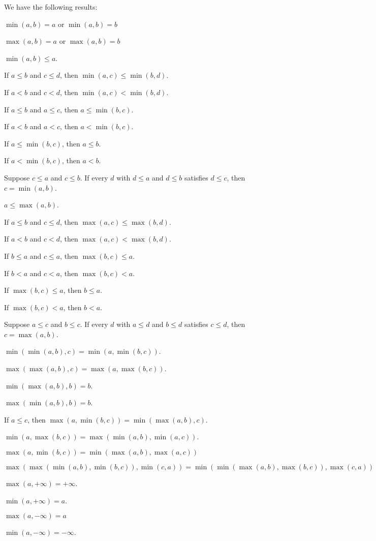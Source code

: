 \documentclass{article}
\begin{document}
We have the following results:
\begin{thm}
\item\label{xxreal0:15} $\min(a,b)=a$ or $\min(a,b)=b$
\item\label{xxreal0:16} $\max(a,b)=a$ or $\max(a,b)=b$
\item\label{xxreal0:17} $\min(a,b)\leq a$.
\item\label{xxreal0:18} If $a\leq b$ and $c\leq d$, then $\min(a,c)\leq\min(b,d)$.
\item\label{xxreal0:19} If $a<b$ and $c<d$, then $\min(a,c)<\min(b,d)$.
\item\label{xxreal0:20} If $a\leq b$ and $a\leq c$, then $a\leq\min(b,c)$.
\item\label{xxreal0:21} If $a<b$ and $a<c$, then $a<\min(b,c)$.
\item\label{xxreal0:22} If $a\leq\min(b,c)$, then $a\leq b$.
\item\label{xxreal0:23} If $a<\min(b,c)$, then $a<b$.
\item\label{xxreal0:24} Suppose $c\leq a$ and $c\leq b$.
  If every $d$ with $d\leq a$ and $d\leq b$ satisfies $d\leq c$,
  then $c=\min(a,b)$.
\item\label{xxreal0:25} $a\leq\max(a,b)$.
\item\label{xxreal0:26} If $a\leq b$ and $c\leq d$, then $\max(a,c)\leq\max(b,d)$.
\item\label{xxreal0:27} If $a<b$ and $c<d$, then $\max(a,c)<\max(b,d)$.
\item\label{xxreal0:28} If $b\leq a$ and $c\leq a$, then $\max(b,c)\leq a$.
\item\label{xxreal0:29} If $b<a$ and $c<a$, then $\max(b,c)<a$.
\item\label{xxreal0:30} If $\max(b,c)\leq a$, then $b\leq a$.
\item\label{xxreal0:31} If $\max(b,c)<a$, then $b<a$.
\item\label{xxreal0:32} Suppose $a\leq c$ and $b\leq c$.
  If every $d$ with $a\leq d$ and $b\leq d$ satisfies $c\leq d$, then $c=\max(a,b)$.
\item\label{xxreal0:33} $\min(\min(a,b),c)=\min(a,\min(b,c))$.
\item\label{xxreal0:34} $\max(\max(a,b),c)=\max(a,\max(b,c))$.
\item\label{xxreal0:35} $\min(\max(a,b),b)=b$.
\item\label{xxreal0:36} $\max(\min(a,b),b)=b$.
\item\label{xxreal0:37} If $a\leq c$, then $\max(a,\min(b,c))=\min(\max(a,b),c)$.
\item\label{xxreal0:38} $\min(a,\max(b,c))=\max(\min(a,b),\min(a,c))$.
\item\label{xxreal0:39} $\max(a,\min(b,c)) = \min(\max(a,b),\max(a,c))$
\item\label{xxreal0:40} $\max(\max(\min(a,b),\min(b,c)),\min(c,a)) = \min(\min(\max(a,b),\max(b,c)),\max(c,a))$
\item\label{xxreal0:41} $\max(a,+\infty)=+\infty$.
\item\label{xxreal0:42} $\min(a,+\infty)=a$.
\item\label{xxreal0:43} $\max(a,-\infty)=a$
\item\label{xxreal0:44} $\min(a,-\infty)=-\infty$.
\end{thm}
\end{document}
